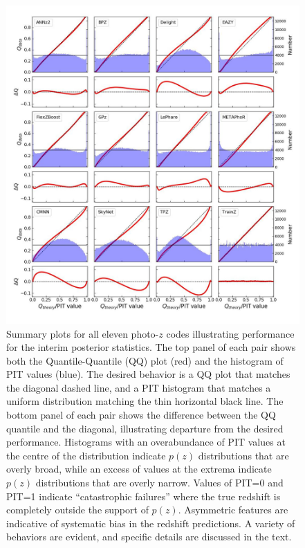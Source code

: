 
\begin{figure}
\centering
\includegraphics[width=\textwidth]{fig/PITANDQQplot_12codes_crop.jpg}
\caption{Summary plots for all eleven photo-$z$ codes illustrating performance for the interim posterior statistics. The top panel of each pair shows both the Quantile-Quantile (QQ) plot (red) and the histogram of PIT values (blue).  The desired behavior is a QQ plot that matches the diagonal dashed line, and a PIT histogram that matches a uniform distribution matching the thin horizontal black line.  The bottom panel of each pair shows the difference between the QQ quantile and the diagonal, illustrating departure from the desired performance.  Histograms with an overabundance of PIT values at the centre of the distribution indicate $p(z)$ distributions that are overly broad, while an excess of values at the extrema indicate $p(z)$ distributions that are overly narrow.  Values of PIT=0 and PIT=1 indicate ``catastrophic failures'' where the true redshift is completely outside the support of $p(z)$.  Asymmetric features are indicative of systematic bias in the redshift predictions.  A variety of behaviors are evident, and specific details are discussed in the text.}
\label{fig:pitqq}
\end{figure}

